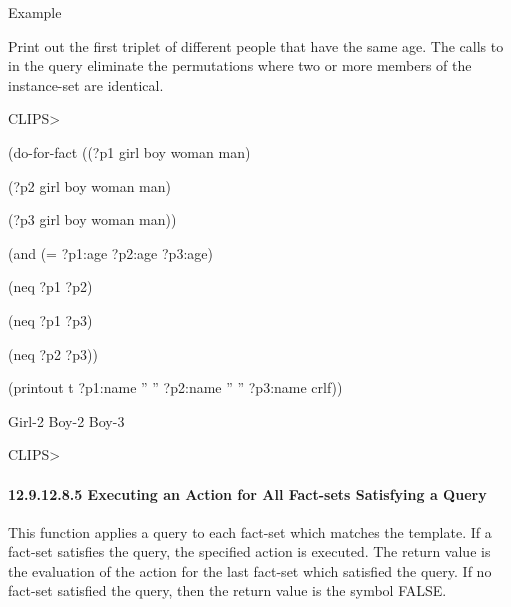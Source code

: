 \documentclass[letterpaper,10pt,english]{sphinxmanual}
\begin{document}

\begin{sphinxVerbatim}[commandchars=\\\{\}]
   
\end{sphinxVerbatim}

Example

Print out the first triplet of different people that have the same age.
The calls to  in the query eliminate the permutations where two
or more members of the instance-set are identical.

CLIPS\textgreater{}

(do-for-fact ((?p1 girl boy woman man)

(?p2 girl boy woman man)

(?p3 girl boy woman man))

(and (= ?p1:age ?p2:age ?p3:age)

(neq ?p1 ?p2)

(neq ?p1 ?p3)

(neq ?p2 ?p3))

(printout t ?p1:name ” ” ?p2:name ” ” ?p3:name crlf))

Girl-2 Boy-2 Boy-3

CLIPS\textgreater{}


\paragraph{12.9.12.8.5 Executing an Action for All Fact-sets Satisfying a Query}
\label{\detokenize{actions:executing-an-action-for-all-fact-sets-satisfying-a-query}}
This function applies a query to each fact-set which matches the
template. If a fact-set satisfies the query, the specified action is
executed. The return value is the evaluation of the action for the last
fact-set which satisfied the query. If no fact-set satisfied the query,
then the return value is the symbol FALSE.


\begin{sphinxVerbatim}[commandchars=\\\{\}]
   
\end{sphinxVerbatim}
\end{document}
